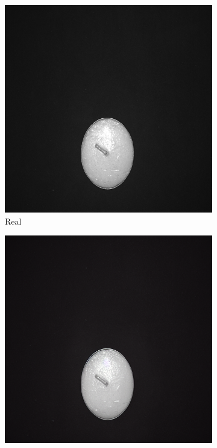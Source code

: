 \documentclass[12pt,DIV14,BCOR12mm,a4paper,footinclude=false,headinclude,parskip=half-,twoside,openright,cleardoublepage=empty,toc=index,bibliography=totoc,listof=totoc]{scrreprt}
\numberwithin{equation}{chapter}
\begin{document}
\begin{figure}
    \begin{minipage}[H]{\linewidth}
        \centering
        \begin{minipage}[H]{0.5\linewidth} %
            \centering
            \begin{subfigure}[t]{0.48\linewidth}
                \centering
                \includegraphics[width=\linewidth]{../media/candle_real_1.png}
                \caption{Real}
            \end{subfigure}%
            \hfill
            \begin{subfigure}[t]{0.48\linewidth}
                \centering
                \includegraphics[width=\linewidth]{../media/candle_generated_1_1.png}

\end{subfigure}
\end{minipage}
\end{minipage}
\end{figure}
\end{document}

